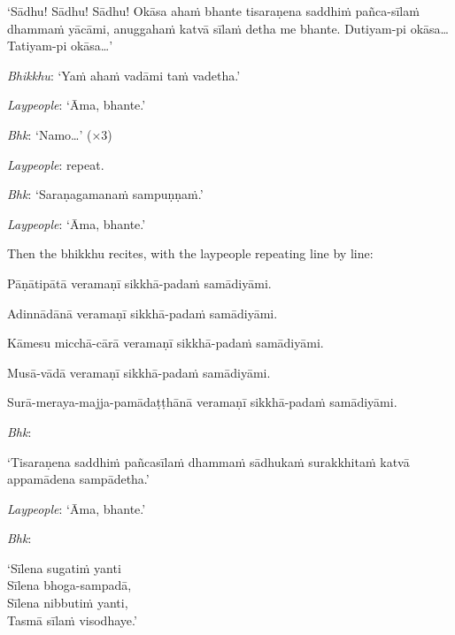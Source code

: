 ‘Sādhu! Sādhu! Sādhu! Okāsa ahaṁ bhante tisaraṇena saddhiṁ pañca-sīlaṁ dhammaṁ
yācāmi, anuggahaṁ katvā sīlaṁ detha me bhante. Dutiyam-pi okāsa… Tatiyam-pi
okāsa…’

\emph{Bhikkhu}: ‘Yaṁ ahaṁ vadāmi taṁ vadetha.’

\emph{Laypeople}: ‘Āma, bhante.’

\emph{Bhk}: ‘Namo…’ (×3)

\emph{Laypeople}: repeat.

\emph{Bhk}: ‘Saraṇagamanaṁ sampuṇṇaṁ.’

\emph{Laypeople}: ‘Āma, bhante.’

Then the bhikkhu recites, with the laypeople repeating line by line:

\begin{packeditemize}

\item Pāṇātipātā veramaṇī sikkhā-padaṁ samādiyāmi.
\item Adinnādānā veramaṇī sikkhā-padaṁ samādiyāmi.
\item Kāmesu micchā-cārā veramaṇī sikkhā-padaṁ samādiyāmi.
\item Musā-vādā veramaṇī sikkhā-padaṁ samādiyāmi.
\item Surā-meraya-majja-pamādaṭṭhānā veramaṇī sikkhā-padaṁ samādiyāmi.

\end{packeditemize}


\emph{Bhk}:

‘Tisaraṇena saddhiṁ pañcasīlaṁ dhammaṁ sādhukaṁ surakkhitaṁ katvā appamādena
sampādetha.’

\emph{Laypeople}: ‘Āma, bhante.’

\emph{Bhk}:

‘Sīlena sugatiṁ yanti\\
Sīlena bhoga-sampadā,\\
Sīlena nibbutiṁ yanti,\\
Tasmā sīlaṁ visodhaye.’

